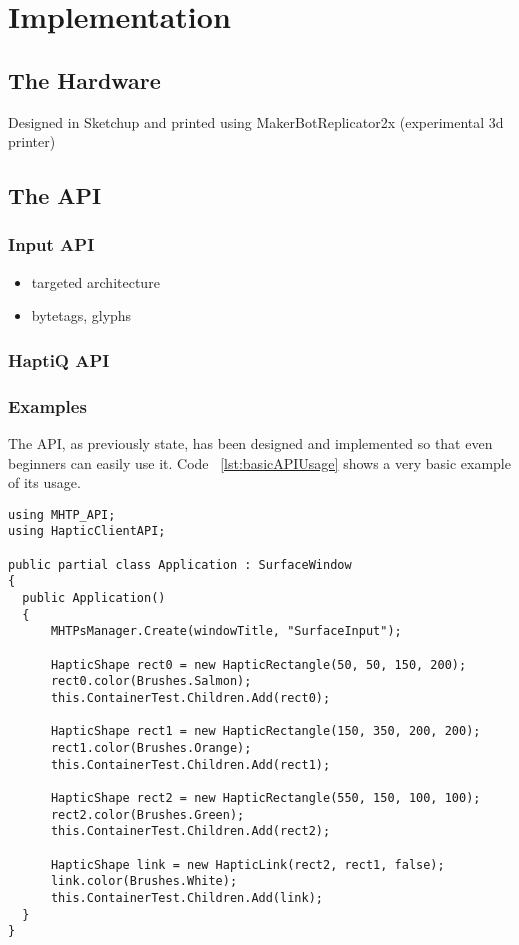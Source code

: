 \chapter{Implementation}

\section{The Hardware}

Designed in Sketchup and printed using MakerBot\textregistered  Replicator\texttrademark 2x (experimental 3d printer)

\section{The API}

\subsection{Input API}

\begin{itemize}
	\item targeted architecture
    \item bytetags, glyphs
\end{itemize}

\subsection{HaptiQ API}

\subsection{Examples}

The API, as previously state, has been designed and implemented so that even beginners can easily use it. Code ~\ref{lst:basicAPIUsage} shows a very basic example of its usage. 


\lstset{style=sharpc}
\begin{lstlisting}[caption={Basic API usage},label={lst:basicAPIUsage}]
using MHTP_API;
using HapticClientAPI;

public partial class Application : SurfaceWindow
{
  public Application()
  {
      MHTPsManager.Create(windowTitle, "SurfaceInput");
      
      HapticShape rect0 = new HapticRectangle(50, 50, 150, 200);
      rect0.color(Brushes.Salmon);
      this.ContainerTest.Children.Add(rect0);
      
      HapticShape rect1 = new HapticRectangle(150, 350, 200, 200);
      rect1.color(Brushes.Orange);
      this.ContainerTest.Children.Add(rect1);
      
      HapticShape rect2 = new HapticRectangle(550, 150, 100, 100);
      rect2.color(Brushes.Green);
      this.ContainerTest.Children.Add(rect2);
      
      HapticShape link = new HapticLink(rect2, rect1, false);
      link.color(Brushes.White);
      this.ContainerTest.Children.Add(link);
  }
}
\end{lstlisting}

